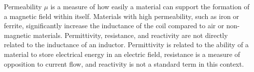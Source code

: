 Permeability \( \mu \) is a measure of how easily a material can support the formation of a magnetic field within itself. Materials with high permeability, such as iron or ferrite, significantly increase the inductance of the coil compared to air or non-magnetic materials. Permittivity, resistance, and reactivity are not directly related to the inductance of an inductor. Permittivity is related to the ability of a material to store electrical energy in an electric field, resistance is a measure of opposition to current flow, and reactivity is not a standard term in this context.

